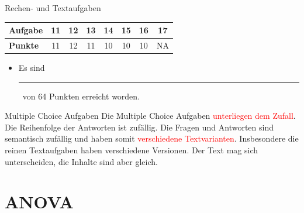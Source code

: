 \documentclass[a4paper, 9pt]{scrartcl}\usepackage[]{graphicx}\usepackage[]{xcolor}
\begin{document}
\begin{graybox}{Rechen- und Textaufgaben}
  \begin{center}
    \large
    \begin{tabular}{|l|c|c|c|c|c|c|c|}
      \hline
      \textbf{Aufgabe} & \textbf{11} & \textbf{12} & \textbf{13} & \textbf{14} & \textbf{15} & \textbf{16} & \textbf{17} \strut\\
      \hline
      \textbf{Punkte} & 
      \hspace{1Ex}\Large\textcolor{gray!70}{11}\hspace{1Ex}  & 
      \hspace{1Ex}\Large\textcolor{gray!70}{12}\hspace{1Ex}  & 
      \hspace{1Ex}\Large\textcolor{gray!70}{11}\hspace{1Ex}  & 
      \hspace{1Ex}\Large\textcolor{gray!70}{10}\hspace{1Ex}  & 
      \hspace{1Ex}\Large\textcolor{gray!70}{10}\hspace{1Ex}  & 
      \hspace{1Ex}\Large\textcolor{gray!70}{10}\hspace{1Ex}  & 
      \hspace{1Ex}\Large\textcolor{gray!70}{NA}\hspace{1Ex} \strut\\
      \hline
  \end{tabular}
\end{center}
\begin{itemize}
\item Es sind \rule[0ex]{2em}{.4pt}\, von 64 Punkten erreicht worden.
\end{itemize}
\end{graybox}

\clearpage
\begin{graybox}{Multiple Choice Aufgaben}
Die Multiple Choice Aufgaben \textcolor{red}{unterliegen dem Zufall}. Die Reihenfolge der Antworten ist zufällig. Die Fragen und Antworten sind semantisch zufällig und haben somit \textcolor{red}{verschiedene Textvarianten}. Insbesondere die reinen Textaufgaben haben verschiedene Versionen. Der Text mag sich unterscheiden, die Inhalte sind aber gleich.
\end{graybox}
\section*{ANOVA}
\end{document}
